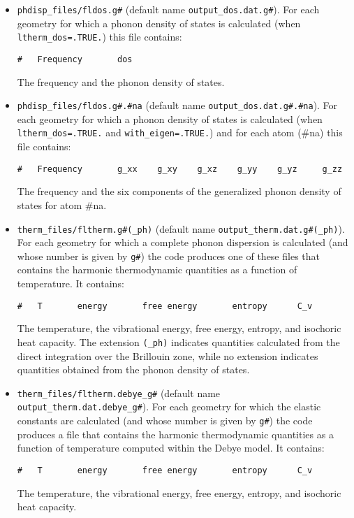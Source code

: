 \documentclass[12pt,a4paper]{article}
\begin{document}
\begin{itemize}
\item 
\texttt{phdisp\_files/fldos.g\#} (default name 
\texttt{output\_dos.dat.g\#}). For each geometry for which a phonon density of 
states is calculated (when \texttt{ltherm\_dos=.TRUE.}) this file contains:
\begin{verbatim}
#   Frequency       dos
\end{verbatim}
The frequency and the phonon density of states. 

\item 
\texttt{phdisp\_files/fldos.g\#.\#na} (default name 
\texttt{output\_dos.dat.g\#.\#na}). For each geometry for which a phonon 
density of states is calculated (when \texttt{ltherm\_dos=.TRUE.} and
\texttt{with\_eigen=.TRUE.}) and for each atom (\#na) this file contains: 
\begin{verbatim}
#   Frequency       g_xx    g_xy    g_xz    g_yy    g_yz     g_zz
\end{verbatim}
The frequency and the six components of the generalized phonon density of 
states for atom \#na. 

\item 
\texttt{therm\_files/fltherm.g\#(\_ph)} (default name 
\texttt{output\_therm.dat.g\#(\_ph)}). For each geometry for which 
a complete phonon dispersion is calculated (and whose number is given
by \texttt{g\#}) the code produces one of these files that contains 
the harmonic 
thermodynamic quantities as a function of temperature. It contains:
\begin{verbatim}
#   T       energy       free energy       entropy      C_v 
\end{verbatim}
The temperature, the vibrational energy, free energy, entropy, and
isochoric heat capacity. The extension \texttt{(\_ph)} indicates 
quantities calculated from the direct integration over the Brillouin zone,
while no extension indicates quantities obtained from the phonon density 
of states.

\item 
\texttt{therm\_files/fltherm.debye\_g\#} (default name 
\texttt{output\_therm.dat.debye\_g\#}). For each geometry for which 
the elastic constants are calculated (and whose number is given
by \texttt{g\#}) the code produces a file that contains 
the harmonic thermodynamic quantities as a function of temperature computed
within the Debye model. It contains:
\begin{verbatim}
#   T       energy       free energy       entropy      C_v 
\end{verbatim}
The temperature, the vibrational energy, free energy, entropy, and
isochoric heat capacity.  


\end{itemize}
\end{document}
